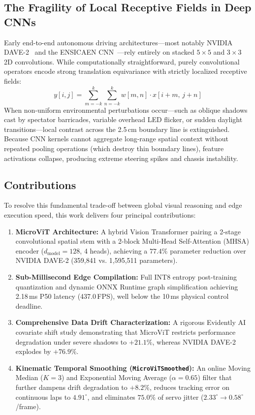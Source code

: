 \documentclass[10pt,journal,compsoc]{IEEEtran}
\begin{document}
\subsection{The Fragility of Local Receptive Fields in Deep CNNs}
Early end-to-end autonomous driving architectures—most notably NVIDIA DAVE-2~\cite{bojarski2016end} and the ENSICAEN CNN~\cite{palhano2026kart}—rely entirely on stacked $5 \times 5$ and $3 \times 3$ 2D convolutions. While computationally straightforward, purely convolutional operators encode strong translation equivariance with strictly localized receptive fields:
\begin{equation}
y[i, j] = \sum_{m=-k}^{k} \sum_{n=-k}^{k} w[m, n] \cdot x[i+m, \, j+n]
\end{equation}
When non-uniform environmental perturbations occur—such as oblique shadows cast by spectator barricades, variable overhead LED flicker, or sudden daylight transitions—local contrast across the 2.5\,cm boundary line is extinguished. Because CNN kernels cannot aggregate long-range spatial context without repeated pooling operations (which destroy thin boundary lines), feature activations collapse, producing extreme steering spikes and chassis instability.

\subsection{Contributions}
To resolve this fundamental trade-off between global visual reasoning and edge execution speed, this work delivers four principal contributions:
\begin{enumerate}
    \item \textbf{MicroViT Architecture:} A hybrid Vision Transformer pairing a 2-stage convolutional spatial stem with a 2-block Multi-Head Self-Attention (MHSA) encoder ($d_{\text{model}} = 128$, 4 heads), achieving a $77.4\%$ parameter reduction over NVIDIA DAVE-2 (359,841 vs. 1,595,511 parameters).
    \item \textbf{Sub-Millisecond Edge Compilation:} Full INT8 entropy post-training quantization and dynamic ONNX Runtime graph simplification achieving 2.18\,ms P50 latency (437.0\,FPS), well below the 10\,ms physical control deadline.
    \item \textbf{Comprehensive Data Drift Characterization:} A rigorous Evidently AI covariate shift study demonstrating that MicroViT restricts performance degradation under severe shadows to $+21.1\%$, whereas NVIDIA DAVE-2 explodes by $+76.9\%$.
    \item \textbf{Kinematic Temporal Smoothing (\texttt{MicroViTSmoothed}):} An online Moving Median ($K=3$) and Exponential Moving Average ($\alpha=0.65$) filter that further dampens drift degradation to $+8.2\%$, reduces tracking error on continuous laps to $4.91^\circ$, and eliminates $75.0\%$ of servo jitter ($2.33^\circ \to 0.58^\circ$/frame).
\end{enumerate}
\end{document}
